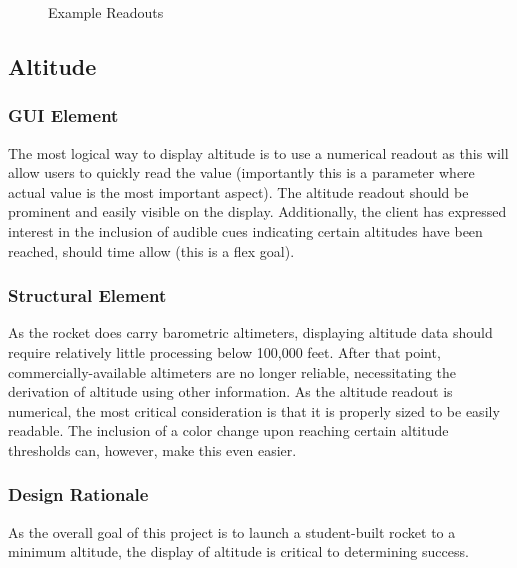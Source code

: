 \documentclass[journal,10pt,onecolumn,compsoc]{IEEEtran}
\begin{document}
\begin{figure}[H]
\centering
{}
\caption{Example Readouts}
\end{figure}      
      
	\subsection{Altitude}

		\subsubsection{GUI Element}
			The most logical way to display altitude is to use a numerical readout as this will allow users to quickly read the value (importantly this is a parameter where actual value is the most important aspect).
			The altitude readout should be prominent and easily visible on the display.
			Additionally, the client has expressed interest in the inclusion of audible cues indicating certain altitudes have been reached, should time allow (this is a flex goal).

		\subsubsection{Structural Element}
			As the rocket does carry barometric altimeters, displaying altitude data should require relatively little processing below 100,000 feet.
			After that point, commercially-available altimeters are no longer reliable, necessitating the derivation of altitude using other information.
			As the altitude readout is numerical, the most critical consideration is that it is properly sized to be easily readable.
			The inclusion of a color change upon reaching certain altitude thresholds can, however, make this even easier.
			
		\subsubsection{Design Rationale}
			As the overall goal of this project is to launch a student-built rocket to a minimum altitude, the display of altitude is critical to determining success.
\end{document}

